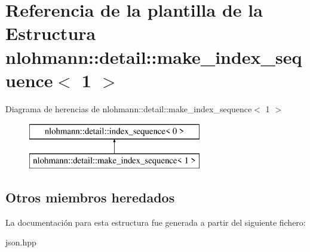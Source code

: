 \hypertarget{structnlohmann_1_1detail_1_1make__index__sequence_3_011_01_4}{}\section{Referencia de la plantilla de la Estructura nlohmann\+:\+:detail\+:\+:make\+\_\+index\+\_\+sequence$<$ 1 $>$}
\label{structnlohmann_1_1detail_1_1make__index__sequence_3_011_01_4}
Diagrama de herencias de nlohmann\+:\+:detail\+:\+:make\+\_\+index\+\_\+sequence$<$ 1 $>$\begin{figure}[H]
\begin{center}
\leavevmode
\includegraphics[height=2.000000cm]{structnlohmann_1_1detail_1_1make__index__sequence_3_011_01_4}
\end{center}
\end{figure}
\subsection*{Otros miembros heredados}


La documentación para esta estructura fue generada a partir del siguiente fichero\+:\begin{DoxyCompactItemize}
\item 
json.\+hpp\end{DoxyCompactItemize}

